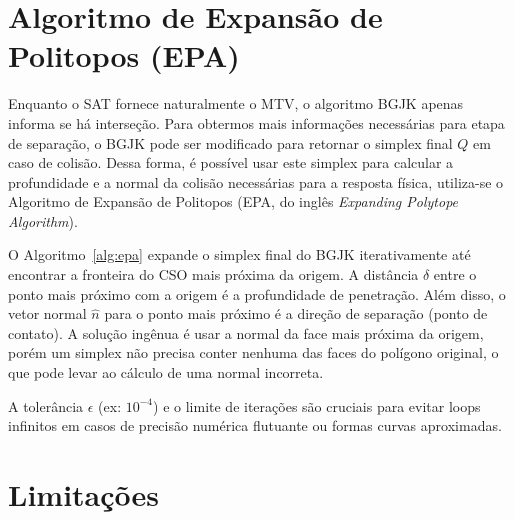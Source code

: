 \section{Algoritmo de Expansão de Politopos (EPA)}

Enquanto o SAT fornece naturalmente o MTV, o algoritmo BGJK apenas informa se há interseção. Para obtermos mais informações necessárias para etapa de separação, o BGJK pode ser modificado para retornar o simplex final $Q$ em caso de colisão. Dessa forma, é possível usar este simplex para calcular a profundidade e a normal da colisão necessárias para a resposta física, utiliza-se o Algoritmo de Expansão de Politopos (EPA, do inglês \textit{Expanding Polytope Algorithm}).

O Algoritmo~\ref{alg:epa} expande o simplex final do BGJK iterativamente até encontrar a fronteira do CSO mais próxima da origem. A distância $\delta$ entre o ponto mais próximo com a origem é a profundidade de penetração. Além disso, o vetor normal $\hat n$ para o ponto mais próximo é a direção de separação (ponto de contato). A solução ingênua é usar a normal da face mais próxima da origem, porém um simplex não precisa conter nenhuma das faces do polígono original, o que pode levar ao cálculo de uma normal incorreta.
\begin{algorithm}[htb]
	\caption{EPA}
	
	\label{alg:epa}
\end{algorithm}
A tolerância $\epsilon$ (ex: $10^{-4}$) e o limite de iterações são cruciais para evitar loops infinitos em casos de precisão numérica flutuante ou formas curvas aproximadas.

\section{Limitações}


